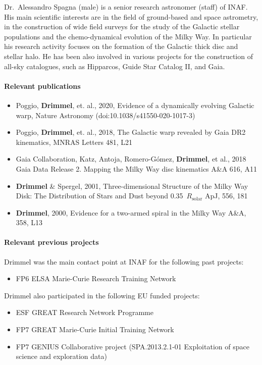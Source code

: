 Dr.~Alessandro Spagna (male) is a senior research astronomer (staff) of INAF. His main scientific interests are in the field of ground-based and space astrometry, in the construction of wide field surveys for the study of the Galactic stellar populations and the chemo-dynamical evolution of the Milky Way. In particular his research activity focuses on the formation of the Galactic thick disc and stellar halo. He has been also involved in various projects for the construction of all-sky catalogues, such as Hipparcos, Guide Star Catalog II, and Gaia. 


\paragraph{Relevant publications}
\begin{itemize}
    \item Poggio, \textbf{Drimmel}, et. al., 2020, Evidence of a dynamically evolving Galactic warp, Nature Astronomy (doi:10.1038/s41550-020-1017-3)
    \item Poggio, \textbf{Drimmel}, et. al., 2018, The Galactic warp revealed by Gaia DR2 kinematics, MNRAS Letters 481, L21
    \item  Gaia Collaboration, Katz, Antoja, Romero-G\'omez, \textbf{Drimmel}, et al., 2018 Gaia Data Release 2. Mapping the Milky Way disc kinematics A\&A 616, A11
    \item \textbf{Drimmel} \& Spergel, 2001, Three-dimensional Structure of the Milky Way Disk: The Distribution of Stars and Dust beyond 0.35~$R_\mathrm{solar}$ ApJ, 556, 181
    \item \textbf{Drimmel}, 2000, Evidence for a two-armed spiral in the Milky Way A\&A, 358, L13
\end{itemize}

\paragraph{Relevant previous projects}

Drimmel was the main contact point at INAF for the following past projects:
\begin{itemize}
    \item FP6 ELSA Marie-Curie Research Training Network
\end{itemize}
Drimmel also participated in the following EU funded projects: 
\begin{itemize}
    \item ESF GREAT Research Network Programme 
    \item FP7 GREAT Marie-Curie Initial Training Network
    \item FP7 GENIUS Collaborative project (SPA.2013.2.1-01 Exploitation of space science and exploration data)
\end{itemize}


